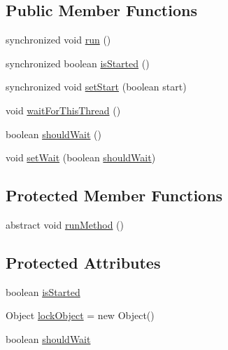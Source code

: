 \subsection*{Public Member Functions}
\begin{DoxyCompactItemize}
\item 
synchronized void \hyperlink{classca_1_1mcgill_1_1ecse211_1_1threads_1_1_thread_control_a03e743000ea2c37080427565e8ec5f35}{run} ()
\item 
synchronized boolean \hyperlink{classca_1_1mcgill_1_1ecse211_1_1threads_1_1_thread_control_a92f4933511db42476e39956246bcf2fe}{is\+Started} ()
\item 
synchronized void \hyperlink{classca_1_1mcgill_1_1ecse211_1_1threads_1_1_thread_control_a16221cdc4ccf637b190934549c708e1f}{set\+Start} (boolean start)
\item 
void \hyperlink{classca_1_1mcgill_1_1ecse211_1_1threads_1_1_thread_control_a6a25ccb2d8916b8e6cc4b3bb0e9d2ed7}{wait\+For\+This\+Thread} ()
\item 
boolean \hyperlink{classca_1_1mcgill_1_1ecse211_1_1threads_1_1_thread_control_a9c3896500e86e402b8019e1be6500621}{should\+Wait} ()
\item 
void \hyperlink{classca_1_1mcgill_1_1ecse211_1_1threads_1_1_thread_control_a7759a6f52b56e15cb37cd25ea31c93c1}{set\+Wait} (boolean \hyperlink{classca_1_1mcgill_1_1ecse211_1_1threads_1_1_thread_control_a8252930dab1b067da64cf2afae4fc630}{should\+Wait})
\end{DoxyCompactItemize}
\subsection*{Protected Member Functions}
\begin{DoxyCompactItemize}
\item 
abstract void \hyperlink{classca_1_1mcgill_1_1ecse211_1_1threads_1_1_thread_control_a2959c54bdb6c62c9d5569cdf3ccf2418}{run\+Method} ()
\end{DoxyCompactItemize}
\subsection*{Protected Attributes}
\begin{DoxyCompactItemize}
\item 
boolean \hyperlink{classca_1_1mcgill_1_1ecse211_1_1threads_1_1_thread_control_abb0ba2385c212f3d0d8435267d882536}{is\+Started}
\item 
Object \hyperlink{classca_1_1mcgill_1_1ecse211_1_1threads_1_1_thread_control_ab20c44ff2dafab8981c42fa8bf634dfc}{lock\+Object} = new Object()
\item 
boolean \hyperlink{classca_1_1mcgill_1_1ecse211_1_1threads_1_1_thread_control_a8252930dab1b067da64cf2afae4fc630}{should\+Wait}
\end{DoxyCompactItemize}
